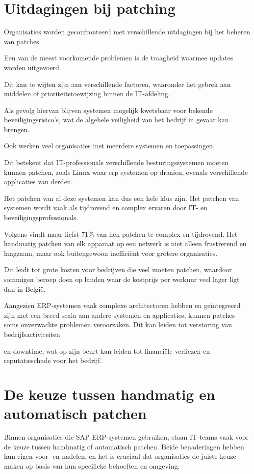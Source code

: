 \section{Uitdagingen bij patching}
Organisaties worden geconfronteerd met verschillende uitdagingen bij het beheren van patches.

Een van de meest voorkomende problemen is de traagheid waarmee updates worden uitgevoerd.

Dit kan te wijten zijn aan verschillende factoren, waaronder het gebrek aan middelen of prioriteitstoewijzing binnen de IT-afdeling.

Als gevolg hiervan blijven systemen mogelijk kwetsbaar voor bekende beveiligingsrisico's, wat de algehele veiligheid van het bedrijf in gevaar kan brengen. \autocite{AppMaster2023}

Ook werken veel organisaties met meerdere systemen en toepassingen.

Dit betekent dat IT-professionals verschillende besturingssystemen moeten kunnen patchen, zoals Linux waar erp systemen op draaien, evenals verschillende applicaties van derden.

Het patchen van al deze systemen kan dus een hele klus zijn. Het patchen van systemen wordt vaak als tijdrovend en complex ervaren door IT- en beveiligingsprofessionals.

Volgens \textcite{ivanti2021} vindt maar liefst 71\% van hen patchen te complex en tijdrovend. Het handmatig patchen van elk apparaat op een netwerk is niet alleen frustrerend en langzaam, maar ook buitengewoon inefficiënt voor grotere organisaties.

Dit leidt tot grote kosten voor bedrijven die veel moeten patchen, waardoor sommigen beroep doen op landen waar de kostprijs per werkuur veel lager ligt dan in België.

Aangezien ERP-systemen vaak complexe architecturen hebben en geïntegreerd zijn met een breed scala aan andere systemen en applicaties, kunnen patches soms onverwachte problemen veroorzaken. Dit kan leiden tot verstoring van bedrijfsactiviteiten 

en downtime, wat op zijn beurt kan leiden tot financiële verliezen en reputatieschade voor het bedrijf.


\section{De keuze tussen handmatig en automatisch patchen}

Binnen organisaties die SAP ERP-systemen gebruiken, staan IT-teams vaak voor de keuze tussen handmatig of automatisch patchen. Beide benaderingen hebben hun eigen voor- en nadelen, en het is cruciaal dat organisaties de juiste keuze maken op basis van hun specifieke behoeften en omgeving.

